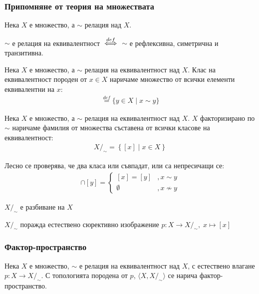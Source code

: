\subsubsection{Припомняне от теория на множествата}
\begin{definition}
    Нека $X$ е множество, а $\sim$ релация над $X$.

    $\sim$ е релация на еквивалентност ${\overset{def}{\iff}}$ $\sim$ е рефлексивна, симетрична и транзитивна.
\end{definition}
\begin{definition}
    Нека $X$ е множество, а $\sim$ релация на еквивалентност над $X$. Клас на еквивалентност породен от $x \in X$ наричаме множество от всички елементи еквивалентни на $x$:
    \begin{eqnarray}
        [x] \overset{def}{=} \{y \in X \mid x \sim y \}
    \end{eqnarray}
\end{definition}

\begin{definition}
    Нека $X$ е множество, а $\sim$ релация на еквивалентност над $X$. $X$ факторизирано по $\sim$ наричаме фамилия от множества съставена от всички класове на еквивалентност:
    \begin{eqnarray}
        X/_\sim = \left\{[x] \mid x \in X\right\}
    \end{eqnarray}
\end{definition}

\begin{fact}
    Лесно се проверява, че два класа или съвпадат, или са непресичащи се:
    \begin{eqnarray}
        [x] \cap [y] = \begin{cases}
            [x] = [y] &, x \sim y\\
            \emptyset &, x \not\sim y
        \end{cases}
    \end{eqnarray}
\end{fact}

\begin{corollary}
    $X/_\sim$ е разбиване на $X$
\end{corollary}
\begin{corollary}
    $X/_\sim$ поражда естествено сюрективно изображение $p: X \to X/_\sim,\; x \mapsto [x]$
\end{corollary}

\subsubsection{Фактор-пространство}
\begin{definition}
    Нека $X$ е множество, $\sim$ е релация на еквивалентност над $X$, с естествено влагане $p: X \to X/_\sim$. С топологията породена от $p$, $\langle X, X/_\sim\rangle$ се нарича фактор-пространство.
\end{definition}

